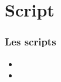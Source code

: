\section{Script}

\begin{frame}
	\frametitle{\textbf{Les scripts}}
	\begin{itemize}
		\item 
		\item 
	\end{itemize}
\end{frame}

